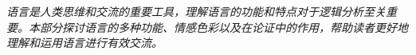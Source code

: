 \begin{logicbox}[title=第二部分：语言与交流]
\textit{语言是人类思维和交流的重要工具，理解语言的功能和特点对于逻辑分析至关重要。本部分探讨语言的多种功能、情感色彩以及在论证中的作用，帮助读者更好地理解和运用语言进行有效交流。}
\end{logicbox}
